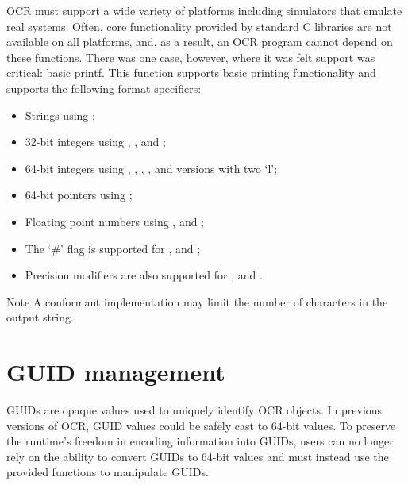 \descr
OCR must support a wide variety of platforms including simulators that emulate
real systems. Often, core functionality provided by standard C libraries are not
available on all platforms, and, as a result, an OCR program cannot depend on
these functions. There was one case, however, where it was felt support was
critical: basic printf. This function supports basic printing functionality
and supports the following format specifiers:
\begin{itemize}
\item Strings using ;
\item 32-bit integers using , ,  and ;
\item 64-bit integers using , , , ,
  and versions with two `l';
\item 64-bit pointers using ;
\item Floating point numbers using ,  and ;
\item The `\#' flag is supported for ,  and ;
\item Precision modifiers are also supported for ,  and .
\end{itemize}

\begin{DoxyNote}{Note}
A conformant implementation may limit the number of characters in the
output string.
\end{DoxyNote}
\section{GUID management}
\label{sec:OCRGuidManagement}

GUIDs are opaque values used to uniquely identify OCR objects. In
previous versions of OCR, GUID values could be safely cast to 64-bit
values. To preserve the runtime's freedom in encoding information into
GUIDs, users can no longer rely on the ability to convert GUIDs to
64-bit values and must instead use the provided functions to
manipulate GUIDs.

